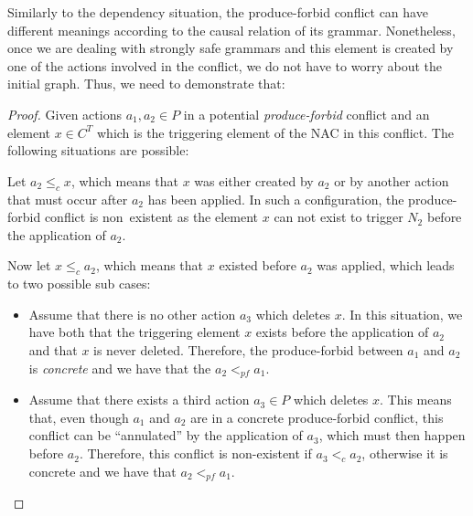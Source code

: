   Similarly to the dependency situation, the produce-forbid conflict can have different meanings according to the causal relation of its grammar. Nonetheless, once we are dealing with strongly safe grammars and this element is created by one of the actions involved in the conflict, we do not have to worry about the initial graph. Thus, we need to demonstrate that:


\begin{proof} Given actions $a_1,a_2 \in P$ in a potential \emph{produce-forbid} conflict and an element $x \in C^T$ which is the triggering element of the NAC in this conflict. The following situations are possible:
\hfill

\begin{description}[style=nextline,leftmargin=*]
  \item[Triggering element is related to the action:]
    Let $a_2 \leq_c x$, which means that $x$ was  either created by $a_2$ or by another action that must occur after $a_2$ has been applied. In such a configuration, the produce-forbid conflict is \mbox{non existent} as the element $x$ can not exist to trigger $N_2$ before the application of $a_2$.

    Now let $x \leq_c a_2$, which means that $x$ existed before $a_2$ was applied, which leads to two possible sub cases:

    \begin{itemize}
      \item Assume that there is no other action $a_3$ which deletes $x$. In this situation, we have both that the triggering element $x$ exists before the application of $a_2$ and that $x$ is never deleted. Therefore, the produce-forbid between $a_1$ and $a_2$ is \emph{concrete} and we have that the $a_2 <_{pf} a_1$.
      \item Assume that there exists a third action $a_3 \in P$ which deletes $x$. This means that, even though $a_1$ and $a_2$ are in a concrete produce-forbid conflict, this conflict can be ``annulated'' by the application of $a_3$, which must then happen before $a_2$. Therefore, this conflict is non-existent if $a_3 <_c a_2$, otherwise it is concrete and we have that $a_2 <_{pf} a_1$.
    \end{itemize}


\end{description}
\end{proof}
